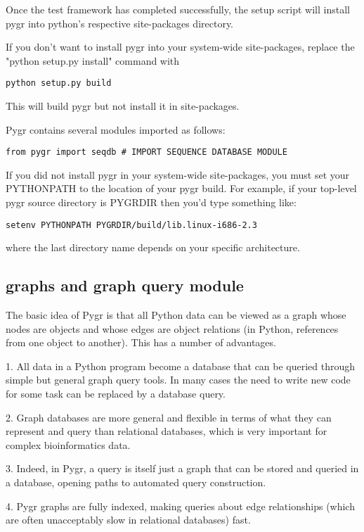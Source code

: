 \documentclass{howto}
\begin{document}
Once the test framework has completed successfully, the setup script
will install pygr into python's respective site-packages directory. 

If you don't want to install pygr into your system-wide site-packages,
replace the "python setup.py install" command with
\begin{verbatim}
python setup.py build
\end{verbatim}
This will build pygr but not install it in site-packages.

Pygr contains several modules imported as follows:
\begin{verbatim}
from pygr import seqdb # IMPORT SEQUENCE DATABASE MODULE
\end{verbatim}

If you did not install pygr in your system-wide site-packages, you 
must set your PYTHONPATH to the location of your pygr build.
For example, if your top-level pygr source directory is PYGRDIR then
you'd type something like:
\begin{verbatim}
setenv PYTHONPATH PYGRDIR/build/lib.linux-i686-2.3
\end{verbatim}
where the last directory name depends on your specific architecture.

\subsection{graphs and graph query module}
\label{graphs-query}

The basic idea of Pygr is that all Python data can be viewed as a graph whose nodes are objects and whose edges are object relations (in Python, references from one object to another).  This has a number of advantages. 

   1. All data in a Python program become a database  that can be queried through simple but general graph query tools.  In many cases the need to write new code for some task can be replaced by a database query. 

   2. Graph databases are more general and flexible in terms of what they can represent and query than relational databases, which is very important for complex bioinformatics data.

   3. Indeed, in Pygr, a query is itself just a graph that can be stored and queried in a database, opening paths to automated query construction.

   4. Pygr graphs are fully indexed, making queries about edge relationships (which are often unacceptably slow in relational databases) fast.
\end{document}
